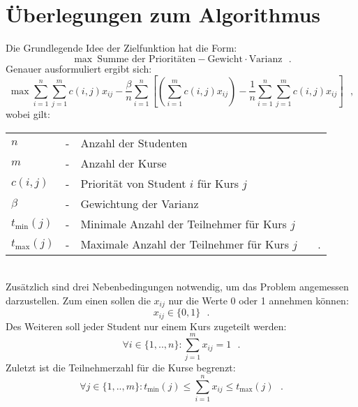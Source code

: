 \section{Überlegungen zum Algorithmus}
        Die Grundlegende Idee der Zielfunktion hat die Form:
            $$ \max ~\text{Summe der Prioritäten} - \text{Gewicht} \cdot \text{Varianz} ~~~.$$
        Genauer ausformuliert ergibt sich:
            $$ \max 
                \sum_{i=1}^{n} \sum_{j=1}^{m} c(i,j)x_{ij} 
                - \frac{\beta}{n} \sum_{i=1}^{n}
                    \left[\left(\sum_{i=1}^{m} c(i,j)x_{ij}\right) - \frac{1}{n} \sum_{i=1}^{n} \sum_{j=1}^{m} c(i,j)x_{ij}\right] ~~~,$$
        wobei gilt:\\
            \begin{tabular}{l c l}
                $n$ & - & Anzahl der Studenten \\
                $m$ & - & Anzahl der Kurse\\
                $ c(i,j) $ & - & Priorität von Student $ i $ für Kurs $ j $\\
                $ \beta $ & - & Gewichtung der Varianz\\
                $t_{\min}(j)$ & - & Minimale Anzahl der Teilnehmer für Kurs $ j $\\
                $t_{\max}(j)$ & - & Maximale Anzahl der Teilnehmer für Kurs $ j $ ~~~.\\
            \end{tabular}\\
        
        Zusätzlich sind drei Nebenbedingungen notwendig, um das Problem angemessen darzustellen.
        Zum einen sollen die $ x_{ij} $ nur die Werte 0 oder 1 annehmen können:
            $$ x_{ij} \in \{0,1\} ~~~.$$
        Des Weiteren soll jeder Student nur einem Kurs zugeteilt werden:
            $$ \forall {i \in \{1,..,n\}}: \sum_{j=1}^{m} x_{ij} = 1 ~~~.$$
        Zuletzt ist die Teilnehmerzahl für die Kurse begrenzt:
            $$ \forall {j \in \{1,..,m\}}: t_{\min}(j) \leq \sum_{i=1}^{n} x_{ij} \leq t_{\max}(j) ~~~.$$